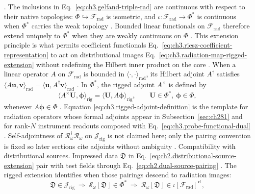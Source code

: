 \cite{stratton1941}.
The inclusions in Eq.~\eqref{eq:ch3.gelfand-triple-rad} are continuous with respect to their native
topologies: \(\Phi\hookrightarrow\mathcal{F}_{\mathrm{rad}}\) is isometric, and
\(\iota:\mathcal{F}_{\mathrm{rad}}\to\Phi^{*}\) is continuous when \(\Phi^{*}\) carries the weak topology
\cite{kato1995}. Bounded linear functionals on \(\mathcal{F}_{\mathrm{rad}}\) therefore extend
uniquely to \(\Phi^{*}\) when they are weakly continuous on \(\Phi\) \cite{kato1995}. This extension
principle is what permits coefficient functionals Eq.~\eqref{eq:ch3.riesz-coefficient-representation} to act
on distributional images Eq.~\eqref{eq:ch3.radiation-map-rigged-extension} without redefining the Hilbert
inner product on the core \cite{stratton1941}.
When a linear operator \(A\) on \(\mathcal{F}_{\mathrm{rad}}\) is bounded in
\(\langle\cdot,\cdot\rangle_{\mathrm{rad}}\), its Hilbert adjoint \(A^{\dagger}\) satisfies
\(\langle A\mathbf{u},\mathbf{v}\rangle_{\mathrm{rad}}=\langle\mathbf{u},A^{\dagger}\mathbf{v}\rangle_{\mathrm{rad}}\)
\cite{kato1995}. In \(\Phi^{*}\), the rigged adjoint \(A^{\times}\) is defined by
\begin{equation}
\label{eq:ch3.rigged-adjoint-definition}
\langle A^{\times}\mathbf{U},\boldsymbol{\phi}\rangle_{\mathrm{rig}}
=
\langle \mathbf{U},A\boldsymbol{\phi}\rangle_{\mathrm{rig}},
\qquad
\mathbf{U}\in\Phi^{*},\ \boldsymbol{\phi}\in\Phi,
\end{equation}
whenever \(A\boldsymbol{\phi}\in\Phi\) \cite{kato1995}. Equation
\eqref{eq:ch3.rigged-adjoint-definition} is the template for radiation operators whose formal adjoints
appear in Subsection~\ref{sec:ch281} and for rank-$N$ instrument readouts composed with
Eq.~\eqref{eq:ch3.probe-functional-dual} \cite{stratton1941}. Self-adjointness of
\(\mathcal{R}_\omega^{\dagger}\mathcal{R}_\omega\) on \(\mathcal{J}_{\mathrm{rig}}\) is not claimed here;
only the pairing convention is fixed so later sections cite adjoints without ambiguity
\cite{harrington2001}.
Compatibility with distributional sources. Impressed data \(\mathfrak{D}\) in Eq.~\eqref{eq:ch2.distributional-source-extension} pair with test fields
through Eq.~\eqref{eq:ch2.dual-source-pairing} \cite{stratton1941}. The rigged extension identifies when
those pairings descend to radiation images:
\begin{equation}
\label{eq:ch3.source-to-field-rigged-chain}
\mathfrak{D}\in\mathcal{J}_{\mathrm{rig}}
\ \Longrightarrow\
\mathcal{S}_\omega[\mathfrak{D}]\in\Phi^{*}
\ \Longrightarrow\
\mathcal{R}_\omega[\mathfrak{D}]\in\iota[\mathcal{F}_{\mathrm{rad}}]^{\mathrm{cl}},
\end{equation}
